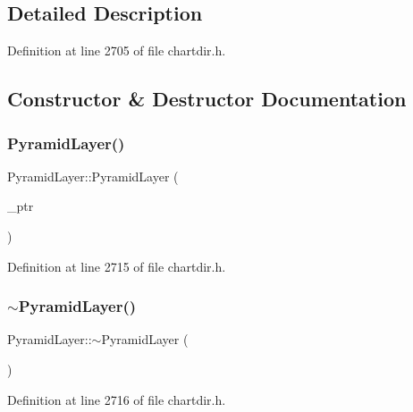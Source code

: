 \subsection{Detailed Description}


Definition at line 2705 of file chartdir.\+h.



\subsection{Constructor \& Destructor Documentation}
\mbox{\label{class_pyramid_layer_a639827a87718856f55386209e7899075}} 
\subsubsection{\texorpdfstring{Pyramid\+Layer()}{PyramidLayer()}}
{\footnotesize\ttfamily Pyramid\+Layer\+::\+Pyramid\+Layer (\begin{DoxyParamCaption}\item[{Pyramid\+Layer\+Internal $\ast$}]{\+\_\+ptr }\end{DoxyParamCaption})\hspace{0.3cm}{\ttfamily [inline]}}



Definition at line 2715 of file chartdir.\+h.

\mbox{\label{class_pyramid_layer_a380560a81da3bb2ec794ca70eebb2587}} 
\subsubsection{\texorpdfstring{$\sim$\+Pyramid\+Layer()}{~PyramidLayer()}}
{\footnotesize\ttfamily Pyramid\+Layer\+::$\sim$\+Pyramid\+Layer (\begin{DoxyParamCaption}{ }\end{DoxyParamCaption})\hspace{0.3cm}{\ttfamily [inline]}}



Definition at line 2716 of file chartdir.\+h.



